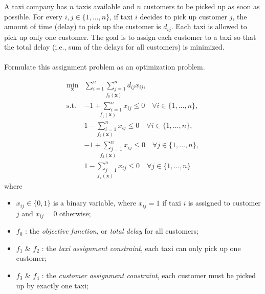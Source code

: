 \begin{homeworkProblem}
    
    A taxi company has $n$ taxis available and $n$ customers to be picked up as 
    soon as possible. For every $i, j \in \{1, \ldots, n\}$, if taxi $i$ decides 
    to pick up customer $j$, the amount of time (delay) to pick up the customer 
    is $d_{ij}$. Each taxi is allowed to pick up only one customer. The goal is 
    to assign each customer to a taxi so that the total delay (i.e., sum of the 
    delays for all customers) is minimized.
    \\ \\
    Formulate this assignment problem as an optimization problem.
    \\

    \begin{solution}
        \[
            \begin{array}{rl}
            \min\limits_{\boldsymbol{x}} & \underset{f_0(\boldsymbol{x})}{\boxed{\sum_{i=1}^{n} \sum_{j=1}^{n} d_{ij} x_{ij}}}, \\ [3ex]
            \text{s.t.} & \underset{f_1(\boldsymbol{x})}{\boxed{-1 + \sum_{i=1}^{n} x_{ij}}} \leq 0 \quad \forall i \in \{1, \dots, n\}, \\ [3ex]
                        & \underset{f_2(\boldsymbol{x})}{\boxed{1 - \sum_{i=1}^{n} x_{ij}}} \leq 0 \quad \forall i \in \{1, \dots, n\}, \\ [3ex]
                        & \underset{f_3(\boldsymbol{x})}{\boxed{-1 + \sum_{j=1}^{n} x_{ij}}} \leq 0 \quad \forall j \in \{1, \dots, n\}, \\ [3ex]
                        & \underset{f_4(\boldsymbol{x})}{\boxed{1 - \sum_{j=1}^{n} x_{ij}}} \leq 0 \quad \forall j \in \{1, \dots, n\}
            \end{array}
        \]
        where
        \begin{itemize}
            \item \(x_{ij} \in \{0, 1\}\) is a binary variable, where \(x_{ij} = 1\) if taxi \(i\) is assigned to customer \(j\) and \(x_{ij} = 0\) otherwise;
            \item $f_0$ : the \textit{objective function}, or \textit{total delay} for all customers;
            \item $f_1$ \& $f_2$ : the \textit{taxi assignment constraint}, each taxi can only pick up one customer;
            \item $f_3$ \& $f_4$ : the \textit{customer assignment constraint}, each customer must be picked up by exactly one taxi;
        \end{itemize}

    \end{solution}
\end{homeworkProblem}